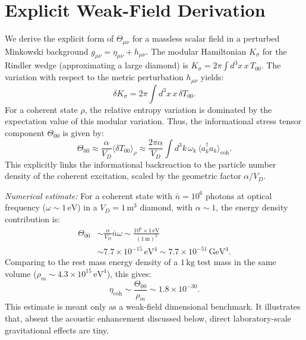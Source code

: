\documentclass[aps,prd,twocolumn,superscriptaddress,nofootinbib,floatfix]{revtex4-2}
\newcommand{\Tmn}{\Theta_{\mu\nu}}
\begin{document}

\section{Explicit Weak-Field Derivation}
\label{appendix:weak-field}

We derive the explicit form of $\Tmn$ for a massless scalar field in a perturbed Minkowski background $g_{\mu\nu} = \eta_{\mu\nu} + h_{\mu\nu}$.
The modular Hamiltonian $K_\sigma$ for the Rindler wedge (approximating a large diamond) is $K_\sigma = 2\pi \int d^3x \, x \, T_{00}$.
The variation with respect to the metric perturbation $h_{\mu\nu}$ yields:
\begin{equation}
    \delta K_\sigma = 2\pi \int d^3x \, x \, \delta T_{00}.
\end{equation}
For a coherent state $\rho$, the relative entropy variation is dominated by the expectation value of this modular variation.
Thus, the informational stress tensor component $\Theta_{00}$ is given by:
\begin{equation}
    \Theta_{00} \approx \frac{\alpha}{V_D} \langle \delta T_{00} \rangle_\rho \approx \frac{2\pi \alpha}{V_D} \int d^3k \, \omega_k \, \langle a_k^\dagger a_k \rangle_{\mathrm{coh}}.
\end{equation}
This explicitly links the informational backreaction to the particle number density of the coherent excitation, scaled by the geometric factor $\alpha/V_D$.

\emph{Numerical estimate:} For a coherent state with $\bar{n} = 10^6$ photons at optical frequency ($\omega \sim 1\,\mathrm{eV}$) in a $V_D = 1\,\mathrm{m}^3$ diamond, with $\alpha \sim 1$, the energy density contribution is:
\begin{equation}
    \begin{aligned}
    \Theta_{00}
    &\sim \frac{\alpha}{V_D}\bar{n}\omega
    \sim \frac{10^6 \times 1\,\mathrm{eV}}{(1\,\mathrm{m})^3}  \\
    &\sim 7.7\times10^{-15}\,\mathrm{eV}^4
    \sim 7.7\times10^{-51}\,\mathrm{GeV}^4 .
    \end{aligned}
\end{equation}
Comparing to the rest mass energy density of a $1\,\mathrm{kg}$ test mass in the same volume ($\rho_m \sim 4.3\times 10^{15}\,\mathrm{eV}^4$), this gives:
\begin{equation}
    \eta_{\mathrm{coh}} \sim \frac{\Theta_{00}}{\rho_m} \sim 1.8\times 10^{-30}.
\end{equation}
This estimate is meant only as a weak-field dimensional benchmark. It illustrates that, absent the acoustic enhancement discussed below, direct laboratory-scale gravitational effects are tiny.
\end{document}
